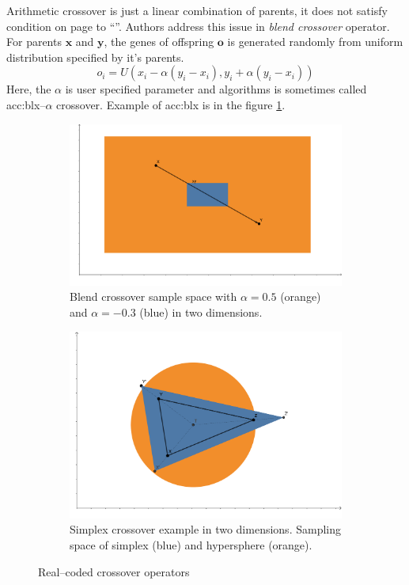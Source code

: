 Arithmetic crossover is just a linear combination of parents, it does not satisfy condition on page \pageref{enum:espopulationvariance} to \enquote{\snipescondition}. Authors \citeauthor*{BlendCrossoverOriginal} address this issue in \emph{blend crossover} operator. For parents $\mathbf{x}$ and $\mathbf{y}$, the genes of offspring $\mathbf{o}$ is generated randomly from uniform distribution specified by it's parents.
$$
o_i = U\left( 
    x_i - \alpha \left( y_i - x_i \right),
    y_i + \alpha \left( y_i - x_i \right)
\right)
$$
Here, the $\alpha$ is user specified parameter and algorithms is sometimes called \acrshort{acc:blx}--$\alpha$ crossover. Example of \acrshort{acc:blx} is in the figure \ref{fig:blendcrossoverexample}.

\begin{figure}
    \begin{subfigure}[t]{0.45\textwidth}
        \includegraphics[width=\textwidth]{img/BLX.pdf}
        \caption{Blend crossover sample space with $\alpha=0.5$ (orange) and $\alpha=-0.3$ (blue) in two dimensions.}
        \label{fig:blendcrossoverexample}
    \end{subfigure}
    \hfill
    \begin{subfigure}[t]{0.45\textwidth}
        \includegraphics[width=\textwidth]{img/SimplexCrossover.pdf}
        \caption{Simplex crossover example in two dimensions. Sampling space of simplex (blue) and hypersphere (orange).}
        \label{fig:simplexcrossoverexample}
    \end{subfigure}
    \caption{Real--coded crossover operators}
\end{figure}

